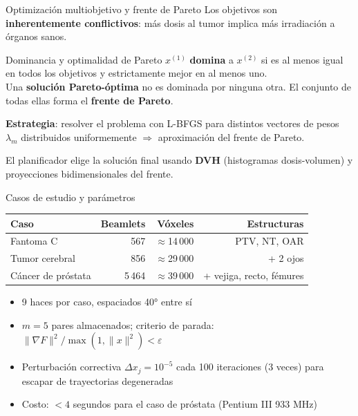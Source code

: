 \documentclass[11pt]{beamer}
\begin{document}
\begin{frame}{Optimización multiobjetivo y frente de Pareto}
Los objetivos son \textbf{inherentemente conflictivos}: más dosis al tumor implica más irradiación a órganos sanos.
\begin{block}{Dominancia y optimalidad de Pareto}
    $x^{(1)}$ \textbf{domina} a $x^{(2)}$ si es al menos igual en todos los objetivos y estrictamente mejor en al menos uno. \\
    Una \textbf{solución Pareto-óptima} no es dominada por ninguna otra.
    El conjunto de todas ellas forma el \textbf{frente de Pareto}.
\end{block}
\textbf{Estrategia}: resolver el problema con L-BFGS para distintos vectores de pesos $\lambda_m$ distribuidos uniformemente $\Rightarrow$ aproximación del frente de Pareto.

El planificador elige la solución final usando \textbf{DVH} (histogramas dosis-volumen) y proyecciones bidimensionales del frente.
\end{frame}

\begin{frame}{Casos de estudio y parámetros}
\begin{center}
\small
\begin{tabular}{lrrr}
\toprule
\textbf{Caso} & \textbf{Beamlets} & \textbf{Vóxeles} & \textbf{Estructuras} \\
\midrule
Fantoma C          & 567   & $\approx$14\,000 & PTV, NT, OAR \\
Tumor cerebral     & 856   & $\approx$29\,000 & + 2 ojos \\
Cáncer de próstata & 5\,464 & $\approx$39\,000 & + vejiga, recto, fémures \\
\bottomrule
\end{tabular}
\end{center}
\begin{itemize}
    \item 9 haces por caso, espaciados 40° entre sí
    \item $m = 5$ pares almacenados; criterio de parada: $\|\nabla F\|^2 / \max(1, \|x\|^2) < \varepsilon$
    \item Perturbación correctiva $\Delta x_j = 10^{-5}$ cada 100 iteraciones (3 veces) para escapar de trayectorias degeneradas
    \item Costo: $< 4$ segundos para el caso de próstata (Pentium III 933 MHz)
\end{itemize}
\end{frame}
\end{document}
